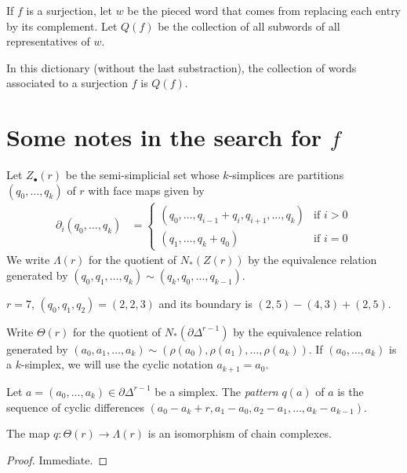 	If $f$ is a surjection, let $w$ be the pieced word that comes from replacing each entry by its complement. Let $Q(f)$ be the collection of all subwords of all representatives of $w$.
	\begin{lemma} In this dictionary (without the last substraction), the collection of words associated to a surjection $f$ is $Q(f)$.
	\end{lemma}

	\section{Some notes in the search for $f$}

	Let $Z_\bullet(r)$ be the semi-simplicial set whose $k$-simplices are partitions $(q_0,\ldots,q_k)$ of $r$ with face maps given by
	\begin{align*}
		\partial_i(q_0,\ldots,q_k) &= \begin{cases}
			(q_0,\ldots,q_{i-1}+q_{i},q_{i+1},\ldots,q_k) & \text{if $i>0$} \\
			(q_1,\ldots,q_{k}+q_0) & \text{if $i=0$}
		\end{cases}
	\end{align*}
	We write $\Lambda(r)$ for the quotient of $N_*(Z(r))$ by the equivalence relation generated by $(q_0,q_1,\ldots,q_k)\sim (q_k,q_0,\ldots,q_{k-1})$.
	\begin{example} $r=7$, $(q_0,q_1,q_2) = (2,2,3)$ and its boundary is $(2,5)-(4,3)+(2,5)$.
	\end{example}
	Write $\Theta(r)$ for the quotient of $N_*(\partial \Delta^{r-1})$ by the equivalence relation generated by $(a_0,a_1,\ldots,a_k)\sim (\rho(a_0),\rho(a_1),\ldots,\rho(a_k))$. If $(a_0,\ldots,a_k)$ is a $k$-simplex, we will use the cyclic notation $a_{k+1} = a_0$.
	\begin{definition} Let $a = (a_0,\ldots,a_k)\in \partial \Delta^{r-1}$ be a simplex. The \emph{pattern} $q(a)$ of $a$ is the sequence of cyclic differences $(a_0-a_k+r,a_1-a_0,a_2-a_1,\ldots,a_k-a_{k-1})$.
	\end{definition}
	\begin{lemma} The map $q\colon \Theta(r)\to \Lambda(r)$ is an isomorphism of chain complexes.
	\end{lemma}
	\begin{proof} Immediate.
	\end{proof}
